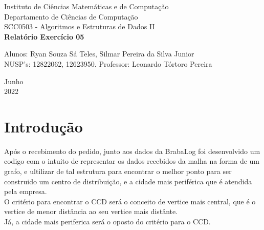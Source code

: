 \documentclass[a4paper, 12pt]{article}
\begin{document}

\begin{titlepage}
	\begin{center}
	

		\Huge{Instituto de Ciências Matemáticas e de Computação}\\
		\large{Departamento de Ciências de Computação}\\ 
		\large{SCC0503 - Algoritmos e Estruturas de Dados II}\\ 
		\vspace{15pt}
        \vspace{95pt}
        \textbf{\LARGE{Relatório Exercício 05}}\\
		\vspace{3,5cm}
	\end{center}
	
	\begin{flushleft}
		\begin{tabbing}
			Alunos: Ryan Souza Sá Teles, Silmar Pereira da Silva Junior \\
            NUSP's: 12822062, 12623950.
			Professor: Leonardo Tórtoro Pereira\\
	\end{tabbing}
 \end{flushleft}
	\vspace{1cm}
	
	\begin{center}
		\vspace{\fill}
			 Junho\\
		 2022
			\end{center}
\end{titlepage}

\newpage
\newpage
\tableofcontents
\thispagestyle{empty}

\newpage
{}
\section{Introdução}
Após o recebimento do pedido, junto aos dados da BrabaLog foi desenvolvido um codigo com o intuito de representar os dados recebidos da malha na forma de um grafo, e ultilizar de tal estrutura para encontrar o melhor ponto para ser construido um centro de distribuição, e a cidade mais periférica que é atendida pela empresa. \\
O critério para encontrar o CCD será o conceito de vertice mais central, que é o vertice de menor distância ao seu vertice mais distânte.\\
Já, a cidade mais periferica será o oposto do critério para o CCD.\\
\end{document}
